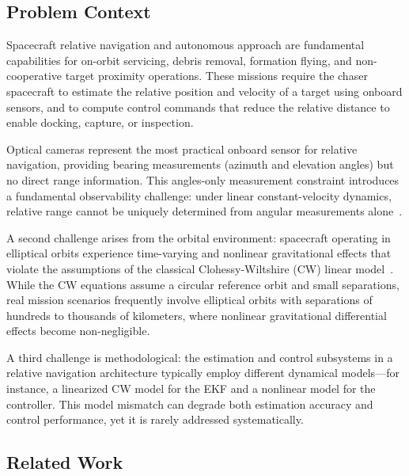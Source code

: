 \documentclass[preprint,3p,times]{elsarticle}
\begin{document}
\subsection{Problem Context}

Spacecraft relative navigation and autonomous approach are fundamental capabilities for on-orbit servicing, debris removal, formation flying, and non-cooperative target proximity operations. These missions require the chaser spacecraft to estimate the relative position and velocity of a target using onboard sensors, and to compute control commands that reduce the relative distance to enable docking, capture, or inspection.

Optical cameras represent the most practical onboard sensor for relative navigation, providing bearing measurements (azimuth and elevation angles) but no direct range information. This angles-only measurement constraint introduces a fundamental observability challenge: under linear constant-velocity dynamics, relative range cannot be uniquely determined from angular measurements alone~\cite{Woffinden2009}.

A second challenge arises from the orbital environment: spacecraft operating in elliptical orbits experience time-varying and nonlinear gravitational effects that violate the assumptions of the classical Clohessy-Wiltshire (CW) linear model~\cite{Clohessy1960}. While the CW equations assume a circular reference orbit and small separations, real mission scenarios frequently involve elliptical orbits with separations of hundreds to thousands of kilometers, where nonlinear gravitational differential effects become non-negligible.

A third challenge is methodological: the estimation and control subsystems in a relative navigation architecture typically employ different dynamical models---for instance, a linearized CW model for the EKF and a nonlinear model for the controller. This model mismatch can degrade both estimation accuracy and control performance, yet it is rarely addressed systematically.

\subsection{Related Work}
\end{document}
